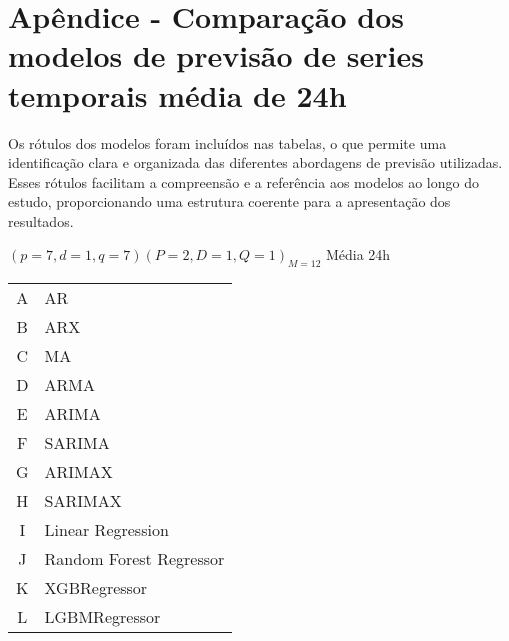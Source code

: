
\section{Ap\^endice - Compara\c c\~ao dos modelos de previs\~ao de series temporais m\'edia de 24h}\label{sec:comtb24}


Os rótulos dos modelos foram incluídos nas tabelas, o que permite uma identificação clara e organizada das diferentes abordagens de previsão utilizadas. Esses rótulos facilitam a compreensão e a referência aos modelos ao longo do estudo, proporcionando uma estrutura coerente para a apresentação dos resultados.

$(p = 7,d = 1,q = 7) (P = 2,D = 1,Q = 1)_{M = 12}$ Média 24h
 
\begin{table}[!htpb]
	\begin{tabular}{@{}cl@{}}
		A & AR                      \\
		B & ARX                     \\
		C & MA                      \\
		D & ARMA                    \\
		E & ARIMA                   \\
		F & SARIMA                  \\
		G & ARIMAX                  \\
		H & SARIMAX                 \\
		I & Linear Regression       \\
		J & Random Forest Regressor \\
		K & XGBRegressor            \\
		L & LGBMRegressor          
	\end{tabular}
\end{table}

\newpage

